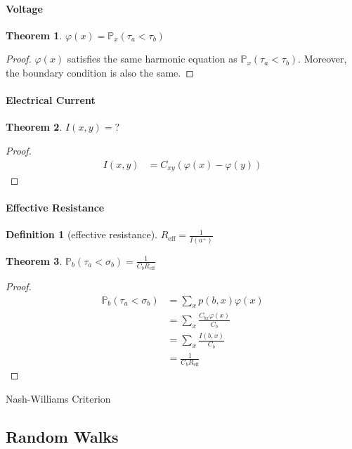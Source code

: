 \documentclass{article}
\newtheorem{Thm}{Theorem}[section]
\theoremstyle{definition}
\newtheorem{Def}{Definition}[section]
\newcommand{\PP}{\mathbb{P}}
\newcommand{\<}{\left\langle}
\renewcommand{\>}{\right\rangle}
\begin{document}
\paragraph{Voltage}
\begin{Thm} 
$\varphi(x)=\PP_x(\tau_a<\tau_b)$
\end{Thm}
\begin{proof}
    $\varphi(x)$ satisfies the same harmonic equation as $\PP_x(\tau_a<\tau_b)$.
    Moreover, the boundary condition is also the same.
\end{proof}


\paragraph{Electrical Current}
\begin{Thm}
    $I(x,y)=?$
\end{Thm}
\begin{proof}
    \begin{align*}
        I(x,y)&=C_{xy}(\varphi(x)-\varphi(y))
    \end{align*}
\end{proof}

\paragraph{Effective Resistance} 
\begin{Def}[effective resistance]
    $R_{\text{eff}}=\frac{1}{I(a^+)}$
\end{Def}

\begin{Thm}
    $\PP_b(\tau_a<\sigma_b)=\frac{1}{C_bR_{\text{eff}}}$
\end{Thm}
\begin{proof}
    \begin{align*}
        \PP_b(\tau_a<\sigma_b)&=\sum_x p(b,x)\varphi(x)\\
        &=\sum_x \frac{C_{bx}\varphi(x)}{C_b}\\
        &=\sum_x \frac{I(b,x)}{C_b}\\
        &=\frac{1}{C_bR_{\text{eff}}}
    \end{align*}
\end{proof}

Nash-Williams Criterion

\subsection{Random Walks}
\end{document}
